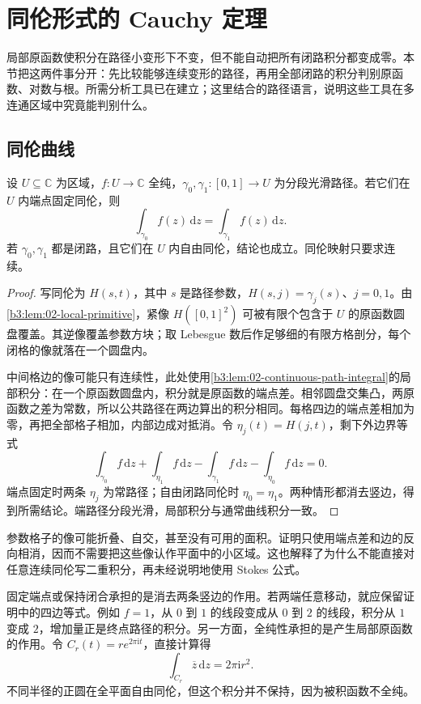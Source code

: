 \section{同伦形式的 Cauchy 定理}
\label{b3:sec:1002}

局部原函数使积分在路径小变形下不变，但不能自动把所有闭路积分都变成零。本节把这两件事分开：先比较能够连续变形的路径，再用全部闭路的积分判别原函数、对数与根。所需分析工具已在建立；这里结合的路径语言，说明这些工具在多连通区域中究竟能判别什么。

\subsection{同伦曲线}
\label{b3:subsec:100201}

\begin{theorem}[同伦积分不变性]\label{b3:thm:10-homotopy-integral}
设 \(U\subseteq\mathbb C\) 为区域，\(f:U\to\mathbb C\) 全纯，\(\gamma_0,\gamma_1:[0,1]\to U\) 为分段光滑路径。若它们在 \(U\) 内端点固定同伦，则
\[
 \int_{\gamma_0}f(z)\,\mathrm{d}z
 =\int_{\gamma_1}f(z)\,\mathrm{d}z.
\]
若 \(\gamma_0,\gamma_1\) 都是闭路，且它们在 \(U\) 内自由同伦，结论也成立。同伦映射只要求连续。
\end{theorem}
\begin{proof}
写同伦为 \(H(s,t)\)，其中 \(s\) 是路径参数，\(H(s,j)=\gamma_j(s)\)、\(j=0,1\)。由\cref{b3:lem:02-local-primitive}，紧像 \(H([0,1]^2)\) 可被有限个包含于 \(U\) 的原函数圆盘覆盖。其逆像覆盖参数方块；取 Lebesgue 数后作足够细的有限方格剖分，每个闭格的像就落在一个圆盘内。

中间格边的像可能只有连续性，此处使用\cref{b3:lem:02-continuous-path-integral}的局部积分：在一个原函数圆盘内，积分就是原函数的端点差。相邻圆盘交集凸，两原函数之差为常数，所以公共路径在两边算出的积分相同。每格四边的端点差相加为零，再把全部格子相加，内部边成对抵消。令 \(\eta_j(t)=H(j,t)\)，剩下外边界等式
\[
 \int_{\gamma_0}f\,\mathrm{d}z+\int_{\eta_1}f\,\mathrm{d}z
 -\int_{\gamma_1}f\,\mathrm{d}z-\int_{\eta_0}f\,\mathrm{d}z=0.
\]
端点固定时两条 \(\eta_j\) 为常路径；自由闭路同伦时 \(\eta_0=\eta_1\)。两种情形都消去竖边，得到所需结论。端路径分段光滑，局部积分与通常曲线积分一致。
\end{proof}
参数格子的像可能折叠、自交，甚至没有可用的面积。证明只使用端点差和边的反向相消，因而不需要把这些像认作平面中的小区域。这也解释了为什么不能直接对任意连续同伦写二重积分，再未经说明地使用 Stokes 公式。

\ProseParagraphBreak
固定端点或保持闭合承担的是消去两条竖边的作用。若两端任意移动，就应保留证明中的四边等式。例如 \(f=1\)，从 \(0\) 到 \(1\) 的线段变成从 \(0\) 到 \(2\) 的线段，积分从 \(1\) 变成 \(2\)，增加量正是终点路径的积分。另一方面，全纯性承担的是产生局部原函数的作用。令 \(C_r(t)=r e^{2\pi\mathrm{i}t}\)，直接计算得
\[
 \int_{C_r}\overline z\,\mathrm{d}z
 =2\pi\mathrm{i}r^2.
\]
不同半径的正圆在全平面自由同伦，但这个积分并不保持，因为被积函数不全纯。

